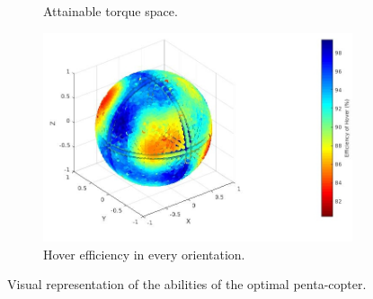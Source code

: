 \begin{figure}[!ht]
\begin{center}
\begin{subfigure}[b]{0.43\textwidth}
      \caption{Attainable torque space.} \label{fig:penta_tspace}
    \end{subfigure}
    \begin{subfigure}[b]{0.47\textwidth}
      \includegraphics[width=\linewidth]{images/Penta_hspace.jpg}
      \caption{Hover efficiency in every orientation.} \label{fig:penta_hspace}
    \end{subfigure}
    \caption{Visual representation of the abilities of the optimal penta-copter.}
    \label{fig:Pentacopter_spaces}
  \end{center}
\end{figure}

